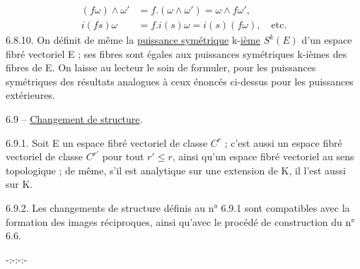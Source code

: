 \[
\begin{aligned}
(f\omega)\wedge\omega'&=f.(\omega\wedge\omega')=\omega\wedge f\omega',\\
i(fs)\omega&=f.i(s)\omega=i(s)(f\omega),\quad\text{etc.}
\end{aligned}
\]
6.8.10. On définit de même la \uline{puissance symétrique} k-\uline{ième} $S^k(E)$ d'un espace fibré vectoriel E ; ses fibres sont égales aux puissances symétriques k-ièmes des fibres de E. On laisse au lecteur le soin de formuler, pour les puissances symétriques des résultats analogues à ceux énoncés ci-dessus pour les puissances extérieures.

6.9 -- \uline{Changement de structure}.

6.9.1. Soit E un espace fibré vectoriel de classe $C^r$ ; c'est aussi un espace fibré vectoriel de classe $C^{r'}$ pour tout $r'\leq r$, ainsi qu'un espace fibré vectoriel au sens topologique ; de même, s'il est analytique sur une extension de K, il l'est aussi sur K.

6.9.2. Les changements de structure définis au n° 6.9.1 sont compatibles avec la formation des images réciproques, ainsi qu'avec le \qquad procédé de construction du n° 6.6.
\begin{center}-:-:-:-\end{center}
